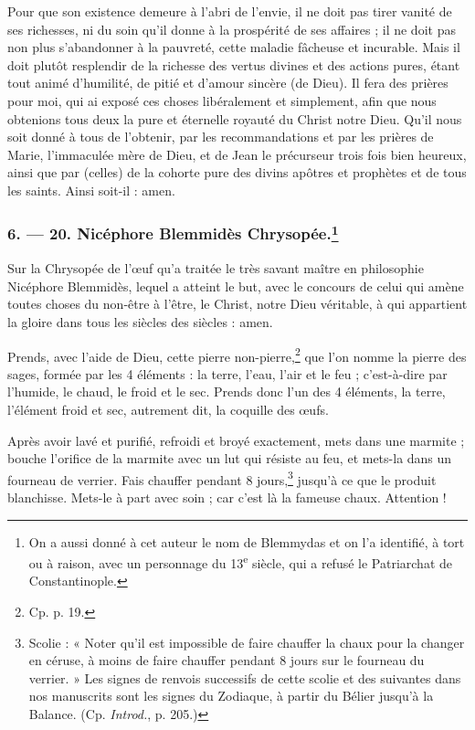 \documentclass[a4paper, 11pt, oneside, polutonikogreek, french]{article}
\begin{document}
Pour que son existence demeure à l'abri de l'envie, il ne doit pas tirer vanité de ses richesses, ni du soin qu'il donne à la prospérité de ses affaires ; il ne doit pas non plus s'abandonner à la pauvreté, cette maladie fâcheuse et incurable. Mais il doit plutôt resplendir de la richesse des vertus divines et des actions pures, étant tout animé d'humilité, de pitié et d'amour sincère (de Dieu). Il fera des prières pour moi, qui ai exposé ces choses libéralement et simplement, afin que nous obtenions tous deux la pure et éternelle royauté du Christ notre Dieu. Qu'il nous soit donné à tous de l'obtenir, par les recommandations et par les prières de Marie, l'immaculée mère de Dieu, et de Jean le précurseur trois fois bien heureux, ainsi que par (celles) de la cohorte pure des divins apôtres et prophètes et de tous les saints. Ainsi soit-il : amen.

\bigskip
\centerline{\EightStarTaper}
\centerline{\EightStarTaper\EightStarTaper}
\bigskip

\subsubsection[6. --- 20. Nicéphore Blemmidès Chrysopée.]{6. --- 20. Nicéphore Blemmidès Chrysopée.\footnote{On a aussi donné à cet auteur le nom de Blemmydas et on l'a identifié, à tort ou à raison, avec un personnage du 13\textsuperscript{e} siècle, qui a refusé le Patriarchat de Constantinople.}}

Sur la Chrysopée de l'œuf qu'a traitée le très savant maître en philosophie Nicéphore Blemmidès, lequel a atteint le but, avec le concours de celui qui amène toutes choses du non-être à l'être, le Christ, notre Dieu véritable, à qui appartient la gloire dans tous les siècles des siècles : amen.

Prends, avec l'aide de Dieu, cette pierre non-pierre,\footnote{Cp. p. 19.} que l'on nomme la pierre des sages, formée par les 4 éléments : la terre, l'eau, l'air et le feu ; c'est-à-dire par l'humide, le chaud, le froid et le sec. Prends donc l'un des 4 éléments, la terre, l'élément froid et sec, autrement dit, la coquille des œufs.

Après avoir lavé et purifié, refroidi et broyé exactement, mets dans une marmite ; bouche l'orifice de la marmite avec un lut qui résiste au feu, et mets-la dans un fourneau de verrier. Fais chauffer pendant 8 jours,\footnote{Scolie : « Noter qu'il est impossible de faire chauffer la chaux pour la changer en céruse, à moins de faire chauffer pendant 8 jours sur le fourneau du verrier. » Les signes de renvois successifs de cette scolie et des suivantes dans nos manuscrits sont les signes du Zodiaque, à partir du Bélier jusqu'à la Balance. (Cp. \emph{Introd.}, p. 205.)} jusqu'à ce que le produit blanchisse. Mets-le à part avec soin ; car c'est là la fameuse chaux. Attention !
\end{document}
